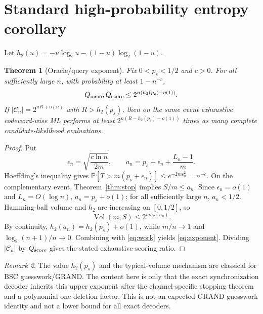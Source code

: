 \documentclass[11pt]{article}
\newtheorem{theorem}{Theorem}
\theoremstyle{remark}\newtheorem{remark}[theorem]{Remark}
\newcommand{\C}{\mathcal C}\newcommand{\I}{\mathcal I}\newcommand{\one}{\mathbf 1}
\newcommand{\Prb}{\mathbb P}\newcommand{\ML}{\operatorname{ML}}
\newcommand{\Vol}{\operatorname{Vol}}\newcommand{\wt}{\operatorname{wt}}
\begin{document}
\section{Standard high-probability entropy corollary}
Let $h_2(u)=-u\log_2u-(1-u)\log_2(1-u)$.
\begin{theorem}[Oracle/query exponent]\label{thm:exp}
Fix $0<p_s<1/2$ and $c>0$. For all sufficiently large $n$, with probability at least $1-n^{-c}$,
\begin{equation}
 Q_{\rm mem},Q_{\rm score}\le2^{n(h_2(p_s)+o(1))}. \label{eq:exponent}
\end{equation}
If $|\C_n|=2^{nR+o(n)}$ with $R>h_2(p_s)$, then on the same event exhaustive codeword-wise ML
performs at least $2^{n(R-h_2(p_s)-o(1))}$ times as many complete candidate-likelihood evaluations.
\end{theorem}
\begin{proof}
Put
\[
 \epsilon_n=\sqrt{\frac{c\ln n}{2m}},\qquad
 a_n=p_s+\epsilon_n+\frac{L_n-1}{m}.
\]
Hoeffding's inequality gives
$\Prb[T>m(p_s+\epsilon_n)]\le e^{-2m\epsilon_n^2}=n^{-c}$. On the complementary event,
Theorem~\ref{thm:stop} implies $S/m\le a_n$. Since $\epsilon_n=o(1)$ and $L_n=O(\log n)$,
$a_n=p_s+o(1)$; for all sufficiently large $n$, $a_n<1/2$. Hamming-ball volume and $h_2$
are increasing on $[0,1/2]$, so
\[
 \Vol(m,S)\le2^{m h_2(a_n)}.
\]
By continuity, $h_2(a_n)=h_2(p_s)+o(1)$, while $m/n\to1$ and
$\log_2(n+1)/n\to0$. Combining with \eqref{eq:work} yields \eqref{eq:exponent}. Dividing
$|\C_n|$ by $Q_{\rm score}$ gives the stated exhaustive-scoring ratio.
\end{proof}
\begin{remark}
The value $h_2(p_s)$ and the typical-volume mechanism are classical for BSC guesswork/GRAND. The
content here is only that the exact synchronization decoder inherits this upper exponent after the
channel-specific stopping theorem and a polynomial one-deletion factor. This is not an expected
GRAND guesswork identity and not a lower bound for all exact decoders.
\end{remark}
\end{document}

